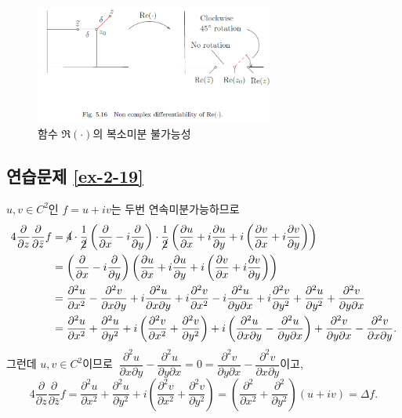 \begin{figure}[h!]
\begin{center}
\includegraphics[width=0.7\textwidth]{./Solution/figs/fig-5-16}
\end{center}
\caption{함수 $\Re(\cdot)$의 복소미분 불가능성}
\label{fig-5-16}
\end{figure}

\subsection*{연습문제 \ref{ex-2-19}}

$u,v\in C^2$인 $f=u+iv$는 두번 연속미분가능하므로
\begin{align*}
4\dfrac\partial{\partial z}\dfrac\partial{\partial \bar z}f
&= \cancel{4}\cdot \dfrac1{\cancel{2}} \left(\dfrac\partial{\partial x} - i \dfrac\partial{\partial y} \right)
\cdot\dfrac1{\cancel{2}} \left( \dfrac{\partial u}{\partial x} + i \dfrac{\partial u}{\partial y}
+ i \left( \dfrac{\partial v}{\partial x} + i \dfrac{\partial v}{\partial y} \right) \right) \\
&=\left(\dfrac\partial{\partial x} - i \dfrac\partial{\partial y} \right)
\left( \dfrac{\partial u}{\partial x} + i \dfrac{\partial u}{\partial y}
+ i \left( \dfrac{\partial v}{\partial x} + i \dfrac{\partial v}{\partial y} \right) \right) \\
&= \dfrac{\partial^2 u}{\partial x^2} - \dfrac{\partial^2 v}{\partial x \partial y}
+ i \dfrac{\partial^2 u}{\partial x \partial y} + i\dfrac{\partial^2 v}{\partial x^2}
- i \dfrac{\partial^2 u}{\partial y \partial x} + i \dfrac{\partial^2 v}{\partial y^2}
+ \dfrac{\partial^2 u}{\partial y^2}  + \dfrac{\partial^2 v}{\partial y\partial x}  \\
&= \dfrac{\partial^2 u}{\partial x^2} + \dfrac{\partial^2 u}{\partial y^2} 
+ i\left( \dfrac{\partial^2 v}{\partial x^2} + \dfrac{\partial^2 v}{\partial y^2} \right)
+ i\left( \dfrac{\partial^2 u}{\partial x\partial y} - \dfrac{\partial^2 u}{\partial y\partial x} \right)
+ \dfrac{\partial^2 v}{\partial y\partial x}  - \dfrac{\partial^2 v}{\partial x\partial y} .
\end{align*}
그런데 $u,v\in C^2$이므로
$\ \dfrac{\partial^2 u}{\partial x\partial y} - \dfrac{\partial^2 u}{\partial y\partial x} = 0
= \dfrac{\partial^2 v}{\partial y\partial x} - \dfrac{\partial^2 v}{\partial x\partial y}$이고,
\[
4\dfrac\partial{\partial z}\dfrac\partial{\partial \bar z}f
= \dfrac{\partial^2 u}{\partial x^2} + \dfrac{\partial^2 u}{\partial y^2} 
+ i \left( \dfrac{\partial^2 v}{\partial x^2} + \dfrac{\partial^2 v}{\partial y^2} \right)
= \left( \dfrac{\partial^2}{\partial x^2} + \dfrac{\partial^2}{\partial y^2} \right)(u+iv)
= \Delta f.
\]




%


